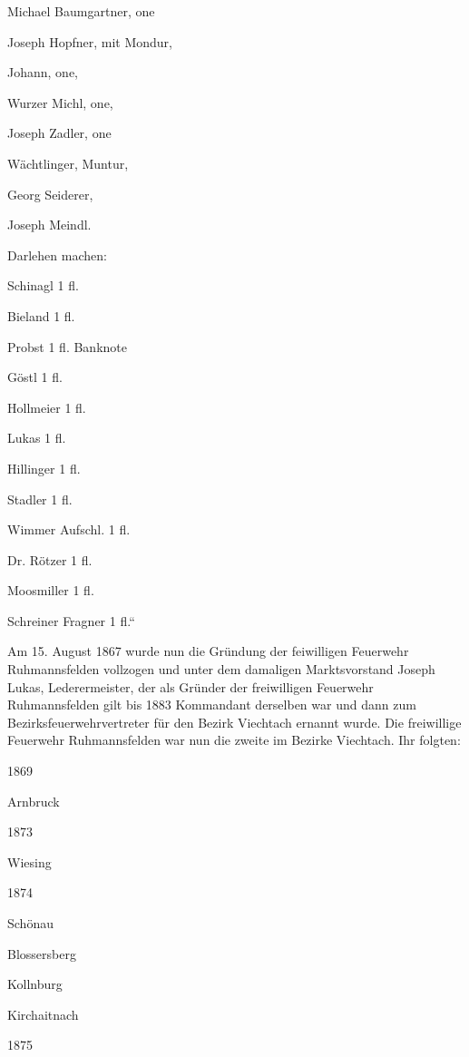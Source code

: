 Michael Baumgartner, one

Joseph Hopfner, mit Mondur,

Johann, one,

Wurzer Michl, one,

Joseph Zadler, one

Wächtlinger, Muntur,

Georg Seiderer,

Joseph Meindl.







Darlehen machen:



Schinagl 1 fl.

Bieland 1 fl.

Probst 1 fl. Banknote

Göstl 1 fl.

Hollmeier 1 fl.

Lukas 1 fl.



Hillinger 1 fl.

Stadler 1 fl.

Wimmer Aufschl. 1 fl.

Dr. Rötzer 1 fl.

Moosmiller 1 fl.

Schreiner Fragner 1 fl.“



Am 15. August 1867 wurde nun die Gründung der feiwilligen Feuerwehr
Ruhmannsfelden vollzogen und unter dem damaligen Marktsvorstand Joseph Lukas,
Lederermeister, der als Gründer der freiwilligen Feuerwehr Ruhmannsfelden gilt
bis 1883 Kommandant derselben war und dann zum Bezirksfeuerwehrvertreter für den
Bezirk Viechtach ernannt wurde. Die freiwillige Feuerwehr Ruhmannsfelden war nun
die zweite im Bezirke Viechtach. Ihr folgten:



1869

Arnbruck

1873

Wiesing

1874

Schönau



Blossersberg



Kollnburg



Kirchaitnach

1875

